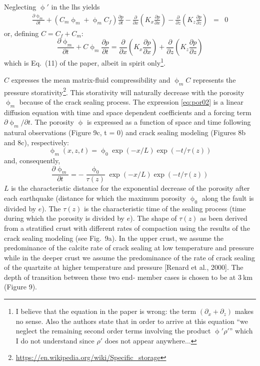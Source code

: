 Neglecting $\upphi'$ in the lhs yields
\begin{eqnarray}
\frac{\partial \upphi_m}{\partial t} 
+ (C_m \upphi_m 
+ \upphi_m C_f )\frac{\partial p}{\partial t} 
- \frac{\partial}{\partial x} \left( K_x \frac{\partial p}{\partial x} \right) 
- \frac{\partial}{\partial z} \left( K_z \frac{\partial p}{\partial z} \right) 
&=& 0 
\end{eqnarray}
or, defining $C=C_f+C_m$:
\begin{equation}
\boxed{
\frac{\partial \upphi_m}{\partial t} 
+ C \upphi_m \frac{\partial p}{\partial t} 
=\frac{\partial}{\partial x} \left( K_x \frac{\partial p}{\partial x} \right) 
+ \frac{\partial}{\partial z} \left( K_z \frac{\partial p}{\partial z} \right)
}
\label{eq:por02}
\end{equation}
which is Eq.~(11) of the paper, albeit in spirit only\footnote{I believe that the equation in the 
paper is wrong: the term $(\partial_x+\partial_z)$ makes no sense.
Also the authors state that in order to arrive at this equation 
``we neglect the remaining second
order terms involving the product $\upphi'\rho'$''
which I do not understand since $\rho'$ does not appear anywhere...}.

$C$ expresses the mean matrix-fluid compressibility and $\upphi_m C$ represents the 
pressure storativity\footnote{\url{https://en.wikipedia.org/wiki/Specific_storage}}. 
This storativity will naturally decrease with
the porosity $\upphi_m$ because of the crack sealing process.
The expression \eqref{eq:por02} is a linear diffusion equation
with time and space dependent coefficients and a forcing
term $\partial \upphi_m/\partial t$. The porosity $\upphi$ is expressed as a function of
space and time following natural observations (Figure 9c,
t = 0) and crack sealing modeling (Figures 8b and 8c),
respectively:
\begin{equation}
\upphi_m(x,z,t)=\upphi_0 \exp (-x/L) \exp (-t/\tau(z))
\label{eq:por03}
\end{equation}
and, consequently,
\begin{equation}
\frac{\partial \upphi_m}{\partial t} = -\frac{\upphi_0}{\tau(z)} \exp (-x/L) \exp (-t/\tau(z)) 
\label{eq:por04}
\end{equation}
$L$ is the characteristic distance for the exponential decrease
of the porosity after each earthquake (distance for which the
maximum porosity $\upphi_0$ along the fault is divided by $e$).
The $\tau(z)$ is the characteristic time of the sealing process
(time during which the porosity is divided by $e$). The
shape of $\tau(z)$ as been derived from a stratified crust with
different rates of compaction using the results of the crack
sealing modeling (see Fig.~9a). In the upper crust, we
assume the predominance of the calcite rate of crack sealing
at low temperature and pressure while in the deeper crust we
assume the predominance of the rate of crack sealing of the
quartzite at higher temperature and pressure [Renard et al., 2000]. 
The depth of transition between these two end-
member cases is chosen to be at $3~\si{\km}$ (Figure 9).

